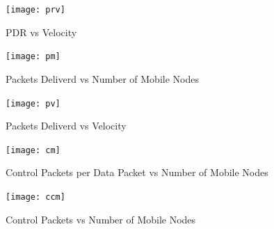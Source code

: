 \documentclass[a4paper, conference, 10pt]{IEEEtran}
\begin{document}
\begin{figure}[h]{} 
	\label{fig:prv}
  \begin{center}
		\texttt{[image: prv]}
  \end{center}
	\caption{PDR vs Velocity}
\end{figure}

\begin{figure}[h]{} 
	\label{fig:pm}
  \begin{center}
		\texttt{[image: pm]}
  \end{center}
	\caption{Packets Deliverd vs Number of Mobile Nodes}
\end{figure}

\begin{figure}[h]{} 
	\label{fig:pv}
  \begin{center}
		\texttt{[image: pv]}
  \end{center}
	\caption{Packets Deliverd vs Velocity}
\end{figure}


\begin{figure}[h]{} 
	\label{fig:cm}
  \begin{center}
		\texttt{[image: cm]}
  \end{center}
	\caption{Control Packets per Data Packet vs Number of Mobile Nodes}
\end{figure}

\begin{figure}[h]{} 
	\label{fig:ccm}
  \begin{center}
		\texttt{[image: ccm]}
  \end{center}
	\caption{Control Packets vs Number of Mobile Nodes}
\end{figure}


%
%
%
%
\end{document}
